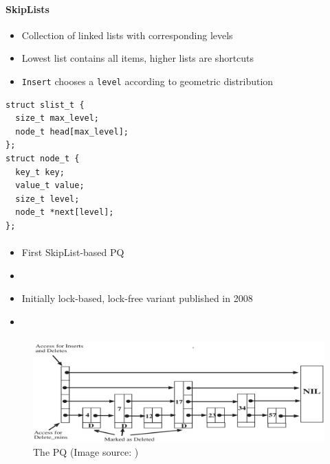 \documentclass[usenames,dvipsnames]{beamer}
\begin{document}
\begin{frame}[fragile]{}
\framesubtitle{SkipLists}

\begin{itemize}
\item Collection of linked lists with corresponding levels
\item Lowest list contains all items, higher lists are shortcuts
\item \lstinline|Insert| chooses a \lstinline|level| according to geometric distribution
\end{itemize}

\begin{lstlisting}
struct slist_t {
  size_t max_level;
  node_t head[max_level];
};
struct node_t {
  key_t key;
  value_t value;
  size_t level;
  node_t *next[level];
};
\end{lstlisting}
\end{frame}


\begin{frame}{}
\framesubtitle{\citeauthor{shavit2000skiplist}}

\begin{itemize}
\item First SkipList-based \ac{PQ}
\item {}
\item Initially lock-based, lock-free variant published in 2008
\item {}
\end{itemize}
\end{frame}

\begin{frame}{}
\framesubtitle{\citeauthor{shavit2000skiplist}}

\begin{figure}
\includegraphics[width=\textwidth]{shavit_lotan}
\caption{The \citeauthor{shavit2000skiplist} \ac{PQ} (Image source: \cite{shavit2000skiplist})}
\end{figure}
\end{frame}
\end{document}
